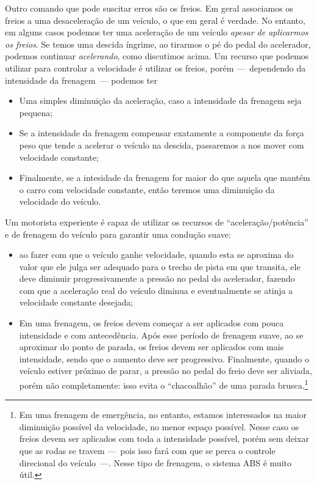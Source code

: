 Outro comando que pode suscitar erros são os freios. Em geral associamos os freios a uma desaceleração de um veículo, o que em geral é verdade. No entanto, em alguns casos podemos ter uma aceleração de um veículo \emph{apesar de aplicarmos os freios}. Se temos uma descida íngrime, ao tirarmos o pé do pedal do acelerador, podemos continuar \emph{acelerando}, como discutimos acima. Um recurso que podemos utilizar para controlar a velocidade é utilizar os freios, porém ---~dependendo da intensidade da frenagem~--- podemos ter
\begin{itemize}
	\item Uma simples diminuição da aceleração, caso a intensidade da frenagem seja pequena;
	\item Se a intensidade da frenagem compensar exatamente a componente da força peso que tende a acelerar o veículo na descida, passaremos a nos mover com velocidade constante;
	\item Finalmente, se a intesidade da frenagem for maior do que aquela que mantém o carro com velocidade constante, então teremos uma diminuição da velocidade do veículo.
\end{itemize}

Um motorista experiente é capaz de utilizar os recursos de ``aceleração/potência'' e de frenagem do veículo para garantir uma condução suave:
\begin{itemize}
	\item ao fazer com que o veículo ganhe velocidade, quando esta se aproxima do valor que ele julga ser adequado para o trecho de pista em que transita, ele deve diminuir progressivamente a pressão no pedal do acelerador, fazendo com que a aceleração real do veículo diminua e eventualmente se atinja a velocidade constante desejada;
	\item Em uma frenagem, os freios devem começar a ser aplicados com pouca intensidade e com antecedência. Após esse período de frenagem suave, ao se aproximar do ponto de parada, os freios devem ser aplicados com mais intensidade, sendo que o aumento deve ser progressivo. Finalmente, quando o veículo estiver próximo de parar, a pressão no pedal do freio deve ser aliviada, porém não completamente: isso evita o ``chacoalhão'' de uma parada brusca.\footnote{Em uma frenagem de emergência, no entanto, estamos interessados na maior diminuição possível da velocidade, no menor espaço possível. Nesse caso os freios devem ser aplicados com toda a intensidade possível, porém sem deixar que as rodas se travem ---~pois isso fará com que se perca o controle direcional do veículo~---. Nesse tipo de frenagem, o sistema ABS é muito útil.}
\end{itemize}

